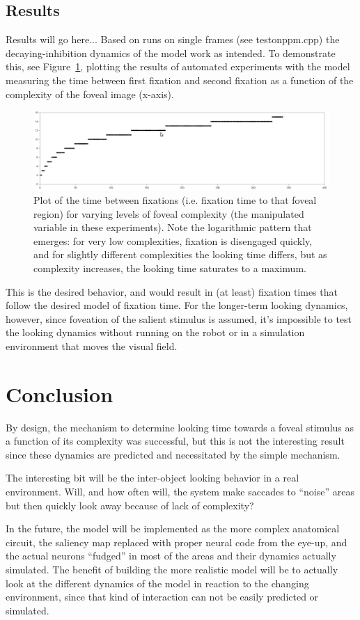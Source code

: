 \documentclass[conference]{IEEEtran}
\begin{document}
\subsection{Results}
Results will go here... Based on runs on single frames (see
testonppm.cpp) the decaying-inhibition dynamics of the model work as
intended. To demonstrate this, see
Figure~\ref{fig:complex_vs_fixtime}, plotting the results of automated
experiments with the model measuring the time between first fixation
and second fixation as a function of the complexity of the foveal
image (x-axis).
\begin{figure} [!t]
\centering
\includegraphics[width=15.0cm]{complex_vs_fixtime.png}
\caption{Plot of the time between fixations (i.e. fixation time to
  that foveal region) for varying levels of foveal complexity (the
  manipulated variable in these experiments). Note the logarithmic
  pattern that emerges: for very low complexities, fixation is
  disengaged quickly, and for slightly different complexities the
  looking time differs, but as complexity increases, the looking time
  saturates to a maximum.}
\label{fig:complex_vs_fixtime}
\end{figure}

This is the desired behavior, and would result in (at least) fixation
times that follow the desired model of fixation time. For the
longer-term looking dynamics, however, since foveation of the salient
stimulus is assumed, it's impossible to test the looking dynamics
without running on the robot or in a simulation environment that moves
the visual field.

\section{Conclusion}
By design, the mechanism to determine looking time towards a foveal
stimulus as a function of its complexity was successful, but this is
not the interesting result since these dynamics are predicted and
necessitated by the simple mechanism.

The interesting bit will be the inter-object looking behavior in a
real environment. Will, and how often will, the system make saccades
to ``noise'' areas but then quickly look away because of lack of
complexity?

In the future, the model will be implemented as the more complex
anatomical circuit, the saliency map replaced with proper neural code
from the eye-up, and the actual neurons ``fudged'' in most of the
areas and their dynamics actually simulated. The benefit of building
the more realistic model will be to actually look at the different
dynamics of the model in reaction to the changing environment, since
that kind of interaction can not be easily predicted or simulated.

% 


\end{document}
